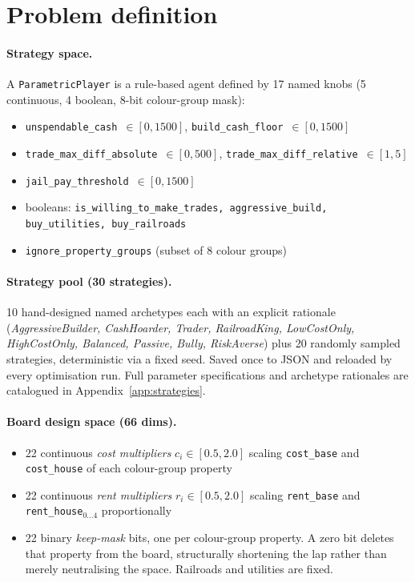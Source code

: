 \documentclass[10pt]{article}
\begin{document}
\section{Problem definition}\label{sec:problem}

\paragraph{Strategy space.} A \texttt{ParametricPlayer} is a rule-based agent
defined by 17 named knobs (5 continuous, 4 boolean, 8-bit colour-group mask):
\begin{itemize}[leftmargin=1.2em,itemsep=0pt]
\item \texttt{unspendable\_cash}~$\in[0,1500]$, \texttt{build\_cash\_floor}~$\in[0,1500]$
\item \texttt{trade\_max\_diff\_absolute}~$\in[0,500]$,
      \texttt{trade\_max\_diff\_relative}~$\in[1,5]$
\item \texttt{jail\_pay\_threshold}~$\in[0,1500]$
\item booleans: \texttt{is\_willing\_to\_make\_trades, aggressive\_build,
      buy\_utilities, buy\_railroads}
\item \texttt{ignore\_property\_groups} (subset of 8 colour groups)
\end{itemize}

\paragraph{Strategy pool (30 strategies).} 10 hand-designed named archetypes
each with an explicit rationale (\textsl{AggressiveBuilder, CashHoarder,
Trader, RailroadKing, LowCostOnly, HighCostOnly, Balanced, Passive, Bully,
RiskAverse}) plus 20 randomly sampled strategies, deterministic via a fixed
seed. Saved once to JSON and reloaded by every optimisation run. Full
parameter specifications and archetype rationales are catalogued in
Appendix~\ref{app:strategies}.

\paragraph{Board design space (66 dims).}
\begin{itemize}[leftmargin=1.2em,itemsep=0pt]
\item 22 continuous \emph{cost multipliers} $c_i\in[0.5,2.0]$ scaling
      \texttt{cost\_base} and \texttt{cost\_house} of each colour-group property
\item 22 continuous \emph{rent multipliers} $r_i\in[0.5,2.0]$ scaling
      \texttt{rent\_base} and \texttt{rent\_house}$_{0\dots 4}$ proportionally
\item 22 binary \emph{keep-mask} bits, one per colour-group property.
      A zero bit deletes that property from the board, structurally
      shortening the lap rather than merely neutralising the space.
      Railroads and utilities are fixed.
\end{itemize}
\end{document}
